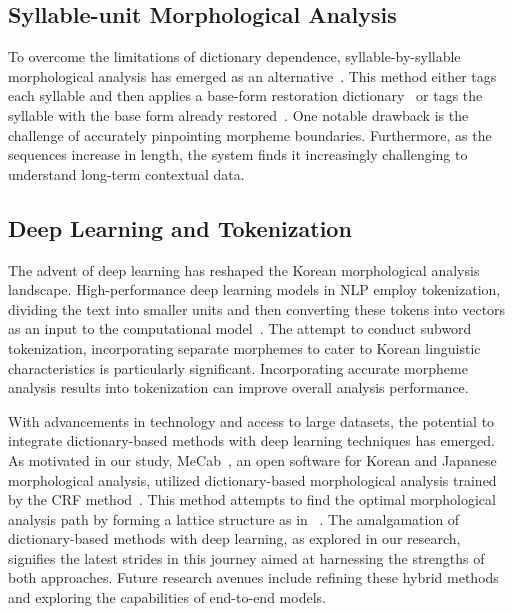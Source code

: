 \documentclass[AMS,STIX2COL]{WileyNJD-v2}
\begin{document}
    \subsection{Syllable-unit Morphological Analysis}\label{subsec2.2}
    To overcome the limitations of dictionary dependence, syllable-by-syllable morphological analysis has emerged as an alternative~\cite{ShimKS2011, LeeCK2013, LeeCH2016, KimHM2016, KimSW2018, ChoiYS2018, KimHM2019, MinJW2019, SongHJ2019, SongHJ2020, YounJY2021, ShinHJ2023}.
    This method either tags each syllable and then applies a base-form restoration dictionary~\cite{ShimKS2011, LeeCH2016} or tags the syllable with the base form already restored~\cite{YounJY2021}.
    One notable drawback is the challenge of accurately pinpointing morpheme boundaries.
    Furthermore, as the sequences increase in length, the system finds it increasingly challenging to understand long-term contextual data.

    \subsection{Deep Learning and Tokenization}\label{subsec2.3}
    The advent of deep learning has reshaped the Korean morphological analysis landscape.
    High-performance deep learning models in NLP employ tokenization, dividing the text into smaller units and then converting these tokens into vectors as an input to the computational model~\cite{Mikolov2013}.
    The attempt to conduct subword tokenization, incorporating separate morphemes to cater to Korean linguistic characteristics is particularly significant.
    Incorporating accurate morpheme analysis results into tokenization can improve overall analysis performance.

    With advancements in technology and access to large datasets, the potential to integrate dictionary-based methods with deep learning techniques has emerged.
    As motivated in our study, MeCab~\cite{MeCab}, an open software for Korean and Japanese morphological analysis, utilized dictionary-based morphological analysis trained by the CRF method~\cite{Lafferty2001}.
    This method attempts to find the optimal morphological analysis path by forming a lattice structure as in ~\cite{Kudo2004, NaSH2014, NaSH2015, NaSH2018}.
    The amalgamation of dictionary-based methods with deep learning, as explored in our research, signifies the latest strides in this journey aimed at harnessing the strengths of both approaches.
    Future research avenues include refining these hybrid methods and exploring the capabilities of end-to-end models.
\end{document}
